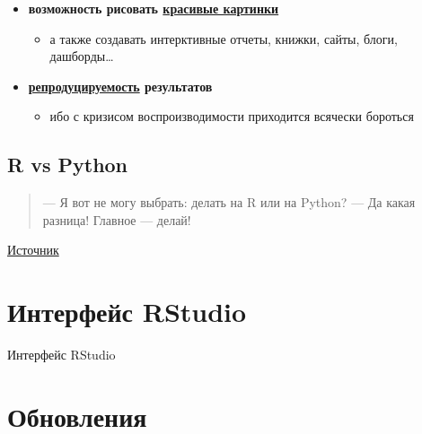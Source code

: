 \documentclass[
  letterpaper,
]{scrbook}
\providecommand{\tightlist}{%
  \setlength{\itemsep}{0pt}\setlength{\parskip}{0pt}}\usepackage{longtable,booktabs,array}
\theoremstyle{definition}
\theoremstyle{remark}
\begin{document}

\begin{itemize}
\tightlist
\item
  \textbf{возможность рисовать
  \href{https://r-graph-gallery.com/index.html}{красивые картинки}}

  \begin{itemize}
  \tightlist
  \item
    а также создавать интерктивные отчеты, книжки, сайты, блоги,
    дашборды\ldots{}
  \end{itemize}
\item
  \textbf{\href{https://en.wikipedia.org/wiki/Reproducibility_Project}{репродуцируемость}
  результатов}

  \begin{itemize}
  \tightlist
  \item
    ибо с кризисом воспроизводимости приходится всячески бороться
  \end{itemize}
\end{itemize}

\subsection{R vs Python}\label{rbasics-r-vs-py}

\begin{quote}
--- Я вот не могу выбрать: делать на R или на Python? --- Да какая
разница! Главное --- делай!
\end{quote}

\href{https://andreyex.ru/programmirovanie/r-vs-python-samaya-aktualnaya-diskussiya-dlya-nachinayushhih-uchenyh-dannyh/}{Источник}

\section{Интерфейс RStudio}\label{rbasics-rstudio-interface}

Интерфейс RStudio

\section{Обновления}\label{rbasics-updates}
\end{document}
